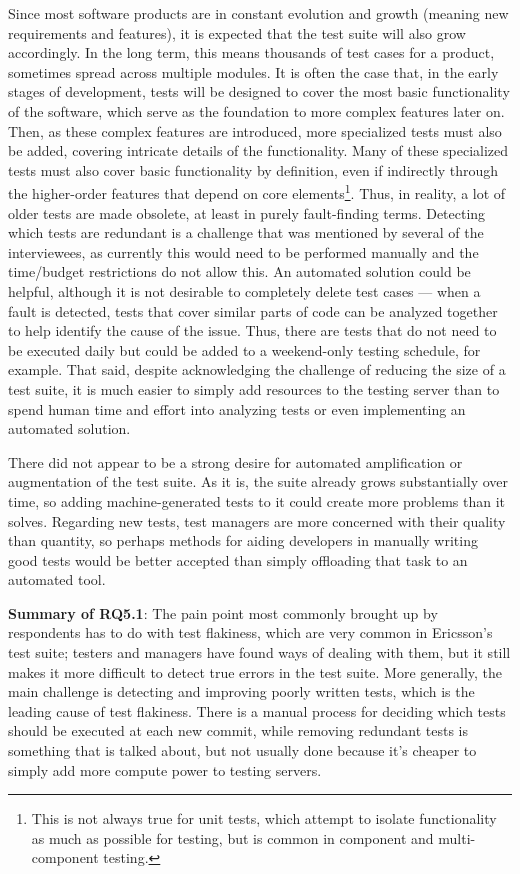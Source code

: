 Since most software products are in constant evolution and growth (meaning new requirements and features), it is expected that the test suite will also grow accordingly.
In the long term, this means thousands of test cases for a product, sometimes spread across multiple modules.
It is often the case that, in the early stages of development, tests will be designed to cover the most basic functionality of the software, which serve as the foundation to more complex features later on.
Then, as these complex features are introduced, more specialized tests must also be added, covering intricate details of the functionality.
Many of these specialized tests must also cover basic functionality by definition, even if indirectly through the higher-order features that depend on core elements\footnote{This is not always true for unit tests, which attempt to isolate functionality as much as possible for testing, but is common in component and multi-component testing.}.
Thus, in reality, a lot of older tests are made obsolete, at least in purely fault-finding terms.
Detecting which tests are redundant is a challenge that was mentioned by several of the interviewees, as currently this would need to be performed manually and the time/budget restrictions do not allow this.
An automated solution could be helpful, although it is not desirable to completely delete test cases — when a fault is detected, tests that cover similar parts of code can be analyzed together to help identify the cause of the issue.
Thus, there are tests that do not need to be executed daily but could be added to a weekend-only testing schedule, for example.
That said, despite acknowledging the challenge of reducing the size of a test suite, it is much easier to simply add resources to the testing server than to spend human time and effort into analyzing tests or even implementing an automated solution.

There did not appear to be a strong desire for automated amplification or augmentation of the test suite.
As it is, the suite already grows substantially over time, so adding machine-generated tests to it could create more problems than it solves.
Regarding new tests, test managers are more concerned with their quality than quantity, so perhaps methods for aiding developers in manually writing good tests would be better accepted than simply offloading that task to an automated tool.

\begin{tcolorbox}%
\textbf{Summary of RQ5.1}: The pain point most commonly brought up by respondents has to do with test flakiness, which are very common in Ericsson's test suite; testers and managers have found ways of dealing with them, but it still makes it more difficult to detect true errors in the test suite.
More generally, the main challenge is detecting and improving poorly written tests, which is the leading cause of test flakiness.
There is a manual process for deciding which tests should be executed at each new commit, while removing redundant tests is something that is talked about, but not usually done because it's cheaper to simply add more compute power to testing servers.
\end{tcolorbox}

